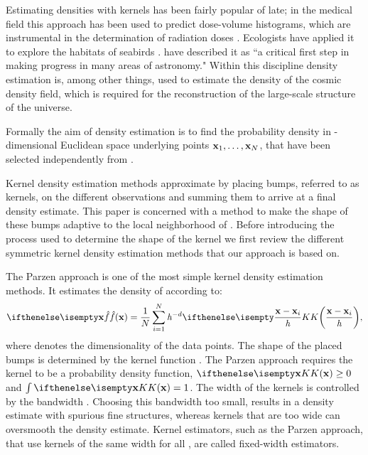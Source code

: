 Estimating densities with kernels has been fairly popular of late; in the medical field this approach has been used to predict dose-volume histograms, which are instrumental in the determination of radiation doses \cite{SkarpmanDose2015}. Ecologists have applied it to explore the habitats of seabirds \cite{lees2016using}. \textcite{ferdosi2011comparison} have described it as ``a critical first step in making progress in many areas of astronomy."  Within this discipline  density estimation is, among other things, used to estimate the density of the cosmic density field, which is required for the reconstruction of the large-scale structure of the universe.

Formally the aim of density estimation is to find the probability density \varDensityFunction{\varPattern} in \varDim-dimensional Euclidean space underlying \varNumPatterns points $\varPattern[1], \dotsc, \varPattern[\varNumPatterns]$, that have been selected independently from \varDensityFunction{\varPattern}. 

Kernel density estimation methods approximate \varDensityFunction{\varPattern} by placing bumps, referred to as kernels, on the different observations and summing them to arrive at a final density estimate. This paper is concerned with a method to make the shape of these bumps adaptive to the local neighborhood of \varPattern. Before introducing the process used to determine the shape of the kernel we first review the different symmetric kernel density estimation methods that our approach is based on. 

	The Parzen approach \cite{parzen1962estimation} is one of the most simple kernel density estimation methods. It estimates the density of \varPattern according to:
	\begin{equation}\label{eq:1:parzen}
		\varEstimatedDensityFunction{\varPattern} = \frac{1}{\varNumPatterns}\sum_{\itXis = 1}^{\varNumPatterns} \varBandwidth^{-\varDim}\varKernel{\frac{\varPattern - \varPattern[\itXis]}{\varBandwidth}},
	\end{equation}
	where \varDim denotes the dimensionality of the data points. The shape of the placed bumps is determined by the kernel function \varKernel{}.  The Parzen approach requires the kernel to be a probability density function, \ie $\varKernel{\varPattern} \geq 0$ and $\int \varKernel{\varPattern} = 1$. 
	The width of the kernels is controlled by the bandwidth \varBandwidth \cite{silverman1986density}. Choosing this bandwidth too small, results in a density estimate with spurious fine structures, whereas kernels that are too wide can oversmooth the density estimate. Kernel estimators, such as the Parzen approach, that use kernels of the same width for all \varPattern[j], are called fixed-width estimators.

